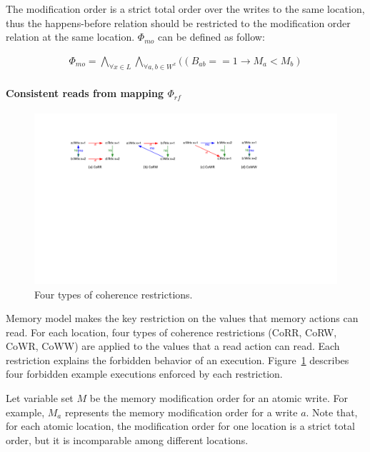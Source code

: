 \documentclass[preprint, numbers, 10pt]{sigplanconf}
\begin{document}
The modification order is a strict total order over the writes to the same location, thus 
the happens-before relation should be restricted to the modification order relation 
at the same location. $\Phi_{mo}$ can be defined as follow: 

\begin{equation}
\begin{aligned}
\Phi_{mo} = \bigwedge_{\forall x\in L }\bigwedge_{\forall a,b\in W^x} ((B_{ab}==1\rightarrow M_a<M_b) 
\end{aligned}
\end{equation} 


\paragraph{Consistent reads from mapping $\Phi_{rf}$}

\begin{figure}%
\centering\includegraphics[scale=0.65]{CO.pdf} %
\caption{Four types of coherence restrictions.}
\label{fig:CO}
\end{figure}

Memory model makes the key restriction on the values that memory actions can read. 
For each location, four types of coherence restrictions 
(CoRR, CoRW, CoWR, CoWW) are applied to the 
values that a read action can read. Each restriction explains the forbidden behavior of 
an execution. Figure~\ref{fig:CO} describes four forbidden example executions enforced
by each restriction. 

Let variable set $M$ be the memory modification order for an atomic write. For example, 
$M_{a}$ represents the memory modification order for a write $a$. 
Note that, for each atomic location, the modification order for one location is a strict total order, but 
it is incomparable among different locations. 
\end{document}
